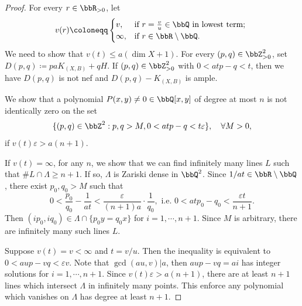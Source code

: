     \begin{proof}
        For every \(r \in \bbR_{> 0}\), let
        \[ v(r) \coloneqq \begin{cases}
            v, & \text{if } r = \frac{v}{u} \in \bbQ \text{ in lowest term; } \\
            \infty, & \text{if } r \in \bbR\setminus \bbQ.
        \end{cases} \]
        We need to show that \(v(t) \leq a(\dim X + 1)\).
        For every \((p,q) \in \bbZ_{>0}^2\), set \(D(p,q) \coloneqq paK_{(X,B)} + qH\).
        If \((p,q)\in \bbZ^2_{>0}\) with \(0< atp-q < t\), then we have \(D(p,q)\) is not nef and \(D(p,q) - K_{(X,B)}\) is ample.

        \begin{step}\label{step_in_thm:rationality_theorem:polynomial_non-vanishing_on_strips}
            We show that a polynomial \(P(x,y) \neq 0 \in \bbQ[x,y]\) of degree at most \(n\) is not identically zero on the set
            \[  \{(p,q) \in \bbZ^2 : p,q>M, 0< atp-q < t\varepsilon\}, \quad \forall M > 0, \]
            if \(v(t)\varepsilon > a(n+1)\).
        \end{step}
        If \(v(t) = \infty\), for any \(n\), we show that we can find infinitely many lines \(L\) such that \(\#L\cap \Lambda \geq n+1\).
        If so, \(\Lambda\) is Zariski dense in \(\bbQ^2\).
        Since \(1/at\in \bbR\setminus \bbQ\), there exist \(p_0,q_0>M\) such that
        \[ 0 < \frac{p_0}{q_0} - \frac{1}{at} < \frac{\varepsilon}{(n+1)a} \cdot \frac{1}{q_0}, \text{ i.e. } 0<atp_0 - q_0 < \frac{\varepsilon t}{n+1}. \]
        Then \((ip_0,iq_0) \in \Lambda \cap \{p_0y=q_0x\}\) for \(i = 1,\cdots,n+1\).
        Since \(M\) is arbitrary, there are infinitely many such lines \(L\).

        Suppose \(v(t) = v < \infty\) and \(t = v/u\).
        Then the inequality is equivalent to \(0 < aup - vq < \varepsilon v\).
        Note that \(\gcd(au,v) | a\), then \(aup - vq = a i\) has integer solutions for \(i = 1,\cdots,n+1\).
        Since \(v(t)\varepsilon > a(n+1)\), there are at least \(n+1\) lines which intersect \(\Lambda\) in infinitely many points.
        This enforce any polynomial which vanishes on \(\Lambda\) has degree at least \(n+1\).


\end{proof}
